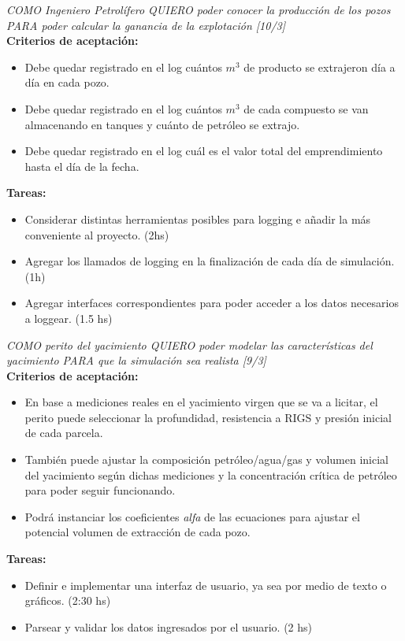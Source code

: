 \begin{tcolorbox}
\textit{COMO Ingeniero Petrolífero QUIERO poder conocer la producción de los pozos PARA poder calcular la ganancia de la explotación [10/3]}\\

\textbf{Criterios de aceptación:}
\begin{itemize}
	\item Debe quedar registrado en el log cuántos $m^3$ de producto se extrajeron día a día en cada pozo.
    \item Debe quedar registrado en el log cuántos $m^3$ de cada compuesto se van almacenando en tanques y cuánto de petróleo se extrajo.
    \item Debe quedar registrado en el log cuál es el valor total del emprendimiento hasta el día de la fecha.
\end{itemize}

\textbf{Tareas:}
\begin{itemize}
	\item Considerar distintas herramientas posibles para logging e añadir la más conveniente al proyecto. (2hs)
    \item Agregar los llamados de logging en la finalización de cada día de simulación. (1h)
    \item Agregar interfaces correspondientes para poder acceder a los datos necesarios a loggear. (1.5 hs)
\end{itemize}
\end{tcolorbox}

\begin{tcolorbox}
\textit{COMO perito del yacimiento QUIERO poder modelar las características del yacimiento PARA que la simulación sea realista [9/3]}\\

\textbf{Criterios de aceptación:}
\begin{itemize}
	\item En base a mediciones reales en el yacimiento virgen que se va a licitar, el perito puede seleccionar la profundidad, resistencia a RIGS y presión inicial de cada parcela.

    \item También puede ajustar la composición petróleo/agua/gas y volumen inicial del yacimiento según dichas mediciones y la concentración crítica de petróleo para poder seguir funcionando.

    \item Podrá instanciar los coeficientes \textit{alfa} de las ecuaciones para ajustar el potencial volumen de extracción de cada pozo.
\end{itemize}

\textbf{Tareas:}
\begin{itemize}
	\item Definir e implementar una interfaz de usuario, ya sea por medio de texto o gráficos. (2:30 hs)
    \item Parsear y validar los datos ingresados por el usuario. (2 hs)
\end{itemize}
\end{tcolorbox}
